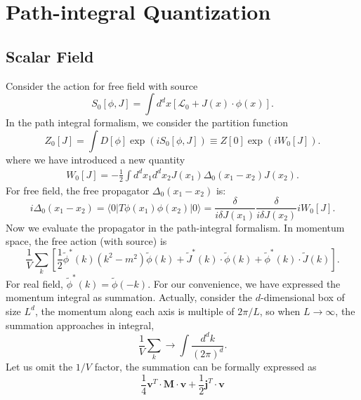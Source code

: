 \section{Path-integral Quantization}

\subsection{Scalar Field}
Consider the action for free field with source
\begin{equation}
	S_0[\phi,J]
	= \int d^dx\left[\mathcal{L}_0 + J(x)\cdot\phi(x) \right].
\end{equation}
In the path integral formalism, we consider the partition function 
\begin{equation}
	Z_0[J] = \int D[\phi] \exp(iS_0[\phi,J])
	\equiv Z[0] \exp(iW_0[J]).
\end{equation}
where we have introduced a new quantity
\begin{equation}
\begin{aligned}
	W_0[J] = -\frac{1}{2}\int d^dx_1 d^dx_2 J(x_1)\Delta_0(x_1-x_2)J(x_2).
\end{aligned}
\end{equation}
For free field, the free propagator $\Delta_0(x_1-x_2)$ is:
\begin{equation}
	i\Delta_0(x_1-x_2) = \langle 0| T\phi(x_1)\phi(x_2)|0\rangle
	= \frac{\delta}{i\delta J(x_1)}\frac{\delta}{i\delta J(x_2)} iW_0[J].
\end{equation}
Now we evaluate the propagator in the path-integral formalism.
In momentum space, the free action (with source) is 
\begin{equation*}
	\frac{1}{V}\sum_k \left[\frac{1}{2}\tilde\phi^*(k)( k^2-m^2)\tilde\phi(k)+\tilde J^*(k)\cdot\tilde\phi(k)+\tilde\phi^*(k)\cdot\tilde J(k)\right].
\end{equation*}
For real field, $\tilde\phi^*(k) = \tilde\phi(-k)$.
For our convenience, we have expressed the momentum integral as summation.
Actually, consider the $d$-dimensional box of size $L^d$, the momentum along each axis is multiple of $2\pi/L$, so when $L\rightarrow \infty$, the summation approaches in integral,
\begin{equation*}
	\frac{1}{V}\sum_k \rightarrow \int \frac{d^d k}{(2\pi)^d}.
\end{equation*}
Let us omit the $1/V$ factor, the summation can be formally expressed as
\begin{equation}
	\frac{1}{4}\mathbf{v}^T \cdot \mathbf M\cdot \mathbf{v} + \frac{1}{2}\mathbf{j}^T \cdot \mathbf{v}
\end{equation}
